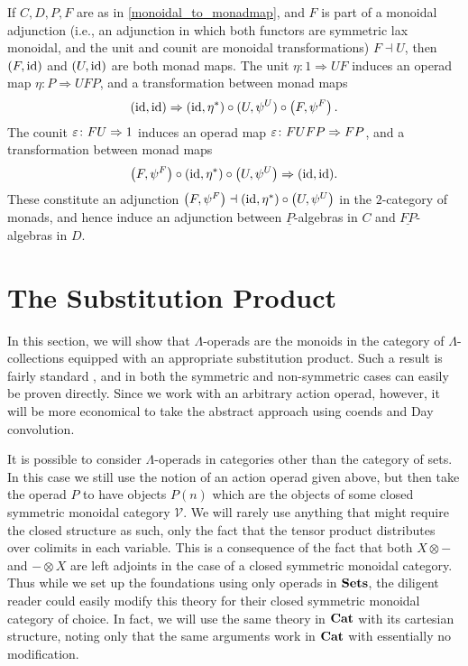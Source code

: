\begin{cor}\label{monoidaladj_cor}
If $C, D, P, F$ are as in \cref{monoidal_to_monadmap}, and $F$ is part of a monoidal adjunction (i.e., an adjunction in which both functors are symmetric lax monoidal, and the unit and counit are monoidal transformations) $F \dashv U$, then $(F, \textrm{id})$ and $(U, \textrm{id})$ are both monad maps. The unit $\eta \colon 1 \Rightarrow UF$ induces an operad map $\eta \colon P \Rightarrow UFP$, and a transformation between monad maps
  \[
    (\textrm{id}, \textrm{id}) \Rightarrow (\textrm{id}, \eta^*) \circ (U, \psi^U) \circ \left(F, \psi^F\right).
  \]
The counit $\varepsilon \colon FU \Rightarrow 1$ induces an operad map $\varepsilon \colon FUFP \Rightarrow FP$, and a transformation between monad maps
  \[
    \left(F, \psi^F\right) \circ (\textrm{id}, \eta^*) \circ \left(U,\psi^U\right) \Rightarrow (\textrm{id}, \textrm{id}).
  \]
These constitute an adjunction $\left(F,\psi^F\right) \dashv (\textrm{id}, \eta^*) \circ \left(U, \psi^U\right)$ in the $2$-category of monads, and hence induce an adjunction between $\underline{P}$-algebras in $C$ and $\underline{FP}$-algebras in $D$.
\end{cor}

\section{The Substitution Product}

In this section, we will show that $\Lambda$-operads are the monoids in the category of $\Lambda$-collections equipped with an appropriate substitution product. Such a result is fairly standard \cite{mss-op}, and in both the symmetric and non-symmetric cases can easily be proven directly. Since we work with an arbitrary action operad, however, it will be more economical to take the abstract approach using coends and Day convolution.

\begin{rem}
It is possible to consider $\Lambda$-operads in categories other than the category of sets. In this case we still use the notion of an action operad given above, but then take the operad $P$ to have objects $P(n)$ which are the objects of some closed symmetric monoidal category $\mathcal{V}$. We will rarely use anything that might require the closed structure as such, only the fact that the tensor product distributes over colimits in each variable. This is a consequence of the fact that both $X \otimes -$ and $- \otimes X$ are left adjoints in the case of a closed symmetric monoidal category. Thus while we set up the foundations using only operads in $\mathbf{Sets}$, the diligent reader could easily modify this theory for their closed symmetric monoidal category of choice. In fact, we will use the same theory in $\mathbf{Cat}$ with its cartesian structure, noting only that the same arguments work in $\mathbf{Cat}$ with essentially no modification.
\end{rem}

